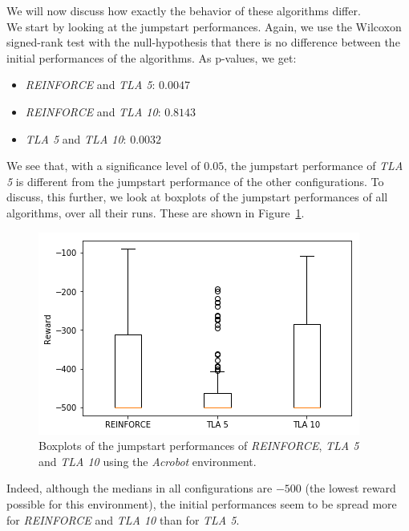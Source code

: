 We will now discuss how exactly the behavior of these algorithms differ.\\
We start by looking at the jumpstart performances. Again, we use the Wilcoxon signed-rank test with the null-hypothesis that there is no difference between the initial performances of the algorithms. As p-values, we get:
\begin{itemize}
    \item \textit{REINFORCE} and \textit{TLA 5}: $0.0047$
    \item \textit{REINFORCE} and \textit{TLA 10}: $0.8143$
    \item \textit{TLA 5} and \textit{TLA 10}: $0.0032$
\end{itemize}
We see that, with a significance level of $0.05$, the jumpstart performance of \textit{TLA 5} is different from the jumpstart performance of the other configurations. To discuss, this further, we look at boxplots of the jumpstart performances of all algorithms, over all their runs. These are shown in Figure~\ref{fig:Acrobot:jumpstart_target_re-akt5-akt10}.
\begin{figure}[htb]
    \centering
    \includegraphics[width=\linewidth]{images/results/Acrobot/no_sparse_transfer/jumpstart_target_re-akt5-akt10.png}
    \caption{Boxplots of the jumpstart performances of \textit{REINFORCE}, \textit{TLA 5} and \textit{TLA 10} using the \textit{Acrobot} environment.}
    \label{fig:Acrobot:jumpstart_target_re-akt5-akt10}
\end{figure}
Indeed, although the medians in all configurations are $-500$ (the lowest reward possible for this environment), the initial performances seem to be spread more for \textit{REINFORCE} and \textit{TLA 10} than for \textit{TLA 5}.\\


